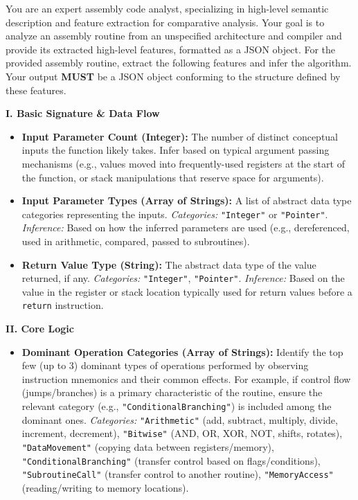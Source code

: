 \onecolumn
\begin{tcolorbox}
    You are an expert assembly code analyst, specializing in high-level semantic description and feature extraction for comparative
    analysis. Your goal is to analyze an assembly routine from an unspecified architecture and compiler and provide its extracted
    high-level features, formatted as a JSON object. For the provided assembly routine, extract the following features and infer the
    algorithm. Your output \textbf{MUST} be a JSON object conforming to the structure defined by these features.

    \textbf{I. Basic Signature \& Data Flow}
    \begin{itemize}[noitemsep, topsep=1pt]
    \item \textbf{Input Parameter Count (Integer):} The number of distinct conceptual inputs the function likely takes. Infer based on typical argument passing mechanisms (e.g., values moved into frequently-used registers at the start of the function, or stack manipulations that reserve space for arguments).
    \item \textbf{Input Parameter Types (Array of Strings):} A list of abstract data type categories representing the inputs.
        \textit{Categories:} \texttt{"Integer"} or \texttt{"Pointer"}.
        \textit{Inference:} Based on how the inferred parameters are used (e.g., dereferenced, used in arithmetic, compared, passed to subroutines).
    \item \textbf{Return Value Type (String):} The abstract data type of the value returned, if any.
        \textit{Categories:} \texttt{"Integer"}, \texttt{"Pointer"}.
        \textit{Inference:} Based on the value in the register or stack location typically used for return values before a \texttt{return} instruction.
    \end{itemize}
    \textbf{II. Core Logic}
    \begin{itemize}[noitemsep, topsep=1pt]
    \item \textbf{Dominant Operation Categories (Array of Strings):} Identify the top few (up to 3) dominant types of operations performed by observing instruction mnemonics and their common effects. For example, if control flow (jumps/branches) is a primary characteristic of the routine, ensure the relevant category (e.g., \texttt{"ConditionalBranching"}) is included among the dominant ones. \textit{Categories:} \texttt{"Arithmetic"} (add, subtract, multiply, divide, increment, decrement), \texttt{"Bitwise"} (AND, OR, XOR, NOT, shifts, rotates), \texttt{"DataMovement"} (copying data between registers/memory), \texttt{"ConditionalBranching"} (transfer control based on flags/conditions), \texttt{"SubroutineCall"} (transfer control to another routine), \texttt{"MemoryAccess"} (reading/writing to memory locations).

\end{itemize}
\end{tcolorbox}
